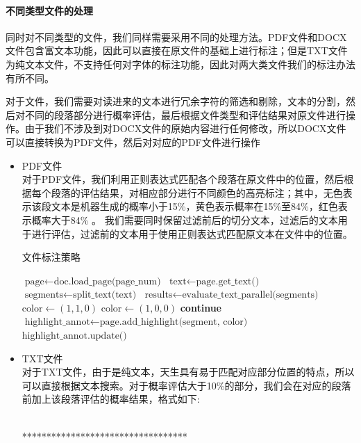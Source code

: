 \documentclass[a4paper]{report}
\begin{document}
\paragraph{不同类型文件的处理}
同时对不同类型的文件，我们同样需要采用不同的处理方法。PDF文件和DOCX文件包含富文本功能，因此可以直接在原文件的基础上进行标注；但是TXT文件为纯文本文件，不支持任何对字体的标注功能，因此对两大类文件我们的标注办法有所不同。

对于文件，我们需要对读进来的文本进行冗余字符的筛选和剔除，文本的分割，然后对不同的段落部分进行概率评估，最后根据文件类型和评估结果对原文件进行操作。由于我们不涉及到对DOCX文件的原始内容进行任何修改，所以DOCX文件可以直接转换为PDF文件，然后对对应的PDF文件进行操作
\begin{itemize}
	\item PDF文件\\
	      对于PDF文件，我们利用正则表达式匹配各个段落在原文件中的位置，然后根据每个段落的评估结果，对相应部分进行不同颜色的高亮标注；其中，无色表示该段文本是机器生成的概率小于15\%，黄色表示概率在15\%至84\%，红色表示概率大于84\% 。
	      我们需要同时保留过滤前后的切分文本，过滤后的文本用于进行评估，过滤前的文本用于使用正则表达式匹配原文本在文件中的位置。
	      \begin{algorithm}[H]
		      \caption{文件标注策略}
		      \begin{algorithmic}[1]
			      \State $\text{page} \gets \text{doc.load\_page(page\_num)}$
			      \State $\text{text} \gets \text{page.get\_text()}$
			      \State $\text{segments} \gets \text{split\_text(text)}$
			      \State $\text{results} \gets \text{evaluate\_text\_parallel(segments)}$
			      \State $\text{color} \gets (1, 1, 0)$ 
			      \State $\text{color} \gets (1, 0, 0)$ 
			      \Else
			      \State \textbf{continue}
			      \EndIf
			      \State $\text{highlight\_annot} \gets \text{page.add\_highlight(segment, color)}$
			      \State $\text{highlight\_annot.update()}$
			      \EndFor
			      \EndFor
			      \EndProcedure
		      \end{algorithmic}
	      \end{algorithm}
	\item TXT文件\\
	      对于TXT文件，由于是纯文本，天生具有易于匹配对应部分位置的特点，所以可以直接根据文本搜索。对于概率评估大于10\%的部分，我们会在对应的段落前加上该段落评估的概率结果，格式如下:\par
	      [机器生成概率：$75.46\%$]\\
	      **********************************
\end{itemize}
\end{document}
